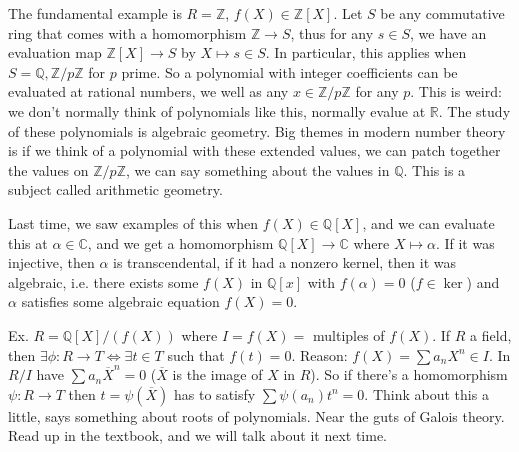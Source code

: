 \documentclass{article}
\theoremstyle{plain}
\theoremstyle{remark}
\newcommand{\Z}{{\mathbb Z}}
\newcommand{\Q}{{\mathbb Q}}
\newcommand{\R}{{\mathbb R}}
\newcommand{\C}{{\mathbb C}}
\begin{document}
The fundamental example is $R = \Z$, $f(X) \in \Z[X]$.
Let $S$ be any commutative ring that comes with a homomorphism $\Z \to S$,
thus for any $s \in S$, we have an evaluation map $\Z[X] \to S$
by $X \mapsto s \in S$.
In particular, this applies when $S = \Q, \Z/p\Z$ for $p$ prime.
So a polynomial with integer coefficients can be evaluated at rational numbers,
we well as any $x \in \Z/p\Z$ for any $p$.
This is weird: we don't normally think of polynomials like this,
normally evalue at $\R$.
The study of these polynomials is algebraic geometry.
Big themes in modern number theory is if we think of a polynomial with these extended values,
we can patch together the values on $\Z/p\Z$, we can say something about the values in $\Q$.
This is a subject called arithmetic geometry.

Last time, we saw examples of this when $f(X) \in \Q[X]$,
and we can evaluate this at $\alpha \in \C$,
and we get a homomorphism $\Q[X] \to \C$ where $X \mapsto \alpha$.
If it was injective, then $\alpha$ is transcendental,
if it had a nonzero kernel, then it was algebraic,
i.e. there exists some $f(X)$ in $\Q[x]$ with $f(\alpha) = 0$ ($f \in \ker$)
and $\alpha$ satisfies some algebraic equation $f(X) = 0$.

Ex. $R = \Q[X]/(f(X))$ where $I = f(X) =$ multiples of $f(X)$.
If $R$ a field, then $\exists \phi \colon R \to T \iff
\exists t \in T$ such that $f(t) = 0$.
Reason: $f(X) = \sum a_nX^n \in I$.
In $R/I$ have $\sum a_n \overline{X}^n = 0$
($\overline{X}$ is the image of $X$ in $R$).
So if there's a homomorphism $\psi \colon R \to T$
then $t = \psi(\overline{X})$ has to satisfy $\sum \psi(a_n)t^n = 0$.
Think about this a little, says something about roots of polynomials.
Near the guts of Galois theory.
Read up in the textbook, and we will talk about it next time.
\end{document}
